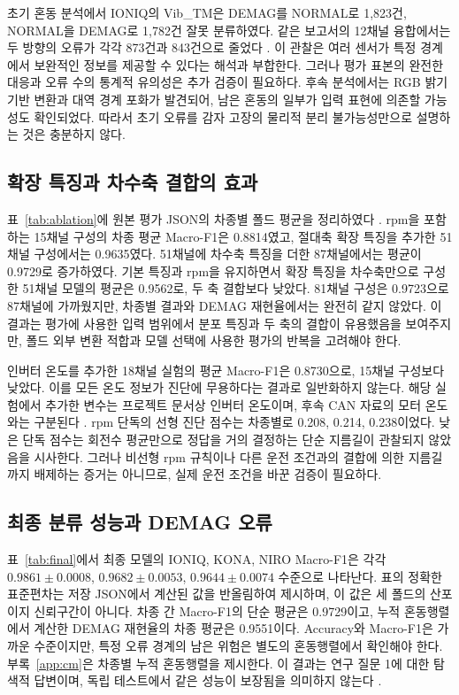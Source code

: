 \documentclass[11pt,a4paper]{article}
\newcommand{\sourceproject}{\citep{project2026}}
\newcommand{\smalltable}[1]{\begingroup\small\setlength{\tabcolsep}{5pt}\endgroup}
\begin{document}
초기 혼동 분석에서 IONIQ의 Vib\_TM은 DEMAG를 NORMAL로 1,823건, NORMAL을 DEMAG로 1,782건 잘못 분류하였다.
같은 보고서의 12채널 융합에서는 두 방향의 오류가 각각 873건과 843건으로 줄었다 \sourceproject.
이 관찰은 여러 센서가 특정 경계에서 보완적인 정보를 제공할 수 있다는 해석과 부합한다.
그러나 평가 표본의 완전한 대응과 오류 수의 통계적 유의성은 추가 검증이 필요하다.
후속 분석에서는 RGB 밝기 기반 변환과 대역 경계 포화가 발견되어, 남은 혼동의 일부가 입력 표현에 의존할 가능성도 확인되었다.
따라서 초기 오류를 감자 고장의 물리적 분리 불가능성만으로 설명하는 것은 충분하지 않다.

\subsection{확장 특징과 차수축 결합의 효과}
표~\ref{tab:ablation}에 원본 평가 JSON의 차종별 폴드 평균을 정리하였다 \sourceproject.
rpm을 포함하는 15채널 구성의 차종 평균 Macro-F1은 0.8814였고, 절대축 확장 특징을 추가한 51채널 구성에서는 0.9635였다.
51채널에 차수축 특징을 더한 87채널에서는 평균이 0.9729로 증가하였다.
기본 특징과 rpm을 유지하면서 확장 특징을 차수축만으로 구성한 51채널 모델의 평균은 0.9562로, 두 축 결합보다 낮았다.
81채널 구성은 0.9723으로 87채널에 가까웠지만, 차종별 결과와 DEMAG 재현율에서는 완전히 같지 않았다.
이 결과는 평가에 사용한 입력 범위에서 분포 특징과 두 축의 결합이 유용했음을 보여주지만, 폴드 외부 변환 적합과 모델 선택에 사용한 평가의 반복을 고려해야 한다.

\begin{table}[htbp]
\centering
\caption{특징 구성별 Macro-F1. 각 차종 값은 3개 폴드 점수의 평균이며, 마지막 열은 차종 평균이다. 12채널은 선택 청크 수가 달라 직접적인 통제 비교에서 제외한다.}
\label{tab:ablation}
\smalltable{ablation.tex}
\end{table}

인버터 온도를 추가한 18채널 실험의 평균 Macro-F1은 0.8730으로, 15채널 구성보다 낮았다.
이를 모든 온도 정보가 진단에 무용하다는 결과로 일반화하지 않는다.
해당 실험에서 추가한 변수는 프로젝트 문서상 인버터 온도이며, 후속 CAN 자료의 모터 온도와는 구분된다 \sourceproject.
rpm 단독의 선형 진단 점수는 차종별로 0.208, 0.214, 0.238이었다.
낮은 단독 점수는 회전수 평균만으로 정답을 거의 결정하는 단순 지름길이 관찰되지 않았음을 시사한다.
그러나 비선형 rpm 규칙이나 다른 운전 조건과의 결합에 의한 지름길까지 배제하는 증거는 아니므로, 실제 운전 조건을 바꾼 검증이 필요하다.

\subsection{최종 분류 성능과 DEMAG 오류}
표~\ref{tab:final}에서 최종 모델의 IONIQ, KONA, NIRO Macro-F1은 각각 $0.9861\pm0.0008$, $0.9682\pm0.0053$, $0.9644\pm0.0074$ 수준으로 나타난다.
표의 정확한 표준편차는 저장 JSON에서 계산된 값을 반올림하여 제시하며, 이 값은 세 폴드의 산포이지 신뢰구간이 아니다.
차종 간 Macro-F1의 단순 평균은 0.9729이고, 누적 혼동행렬에서 계산한 DEMAG 재현율의 차종 평균은 0.9551이다.
Accuracy와 Macro-F1은 가까운 수준이지만, 특정 오류 경계의 남은 위험은 별도의 혼동행렬에서 확인해야 한다.
부록~\ref{app:cm}은 차종별 누적 혼동행렬을 제시한다.
이 결과는 연구 질문 1에 대한 탐색적 답변이며, 독립 테스트에서 같은 성능이 보장됨을 의미하지 않는다 \sourceproject.
\end{document}
